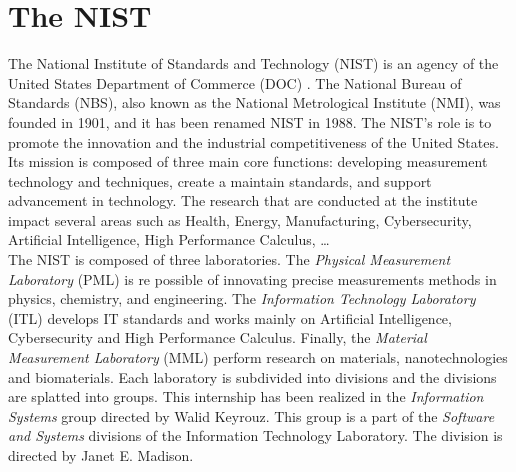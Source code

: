 
\section{The NIST}

The National Institute of Standards and Technology (NIST) is an agency of the
United States Department of Commerce (DOC) \cite{enwiki:nist}. The National
Bureau of Standards (NBS), also known as the National Metrological Institute
(NMI), was founded in 1901, and it has been renamed NIST in 1988. The NIST's
role is to promote the innovation and the industrial competitiveness of the
United States. Its mission is composed of three main core functions: developing
measurement technology and techniques, create a maintain standards, and support
advancement in technology. The research that are conducted at the institute
impact several areas such as Health, Energy, Manufacturing, Cybersecurity,
Artificial Intelligence, High Performance Calculus, \dots\\

The NIST is composed of three laboratories. The \textit{Physical Measurement
Laboratory} (PML) is re possible of innovating precise measurements methods in
physics, chemistry, and engineering. The \textit{Information Technology
Laboratory} (ITL) develops IT standards and works mainly on Artificial
Intelligence, Cybersecurity and High Performance Calculus. Finally, the
\textit{Material Measurement Laboratory} (MML) perform research on materials,
nanotechnologies and biomaterials. Each laboratory is subdivided into divisions
and the divisions are splatted into groups. This internship has been realized in
the \textit{Information Systems} group directed by Walid Keyrouz. This group is
a part of the \textit{Software and Systems} divisions of the Information
Technology Laboratory. The division is directed by Janet E. Madison.
